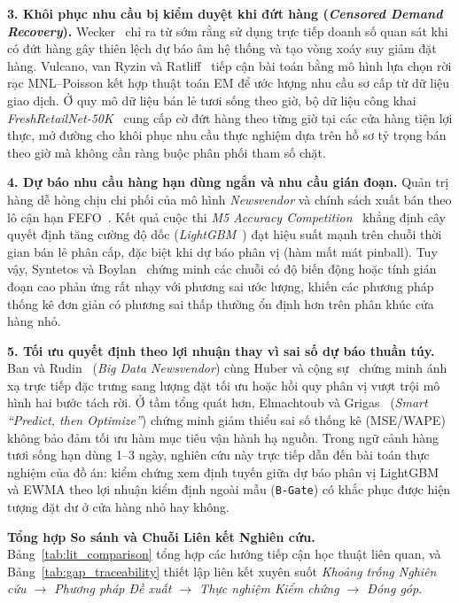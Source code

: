 \textbf{3. Khôi phục nhu cầu bị kiểm duyệt khi đứt hàng (\emph{Censored Demand Recovery}).}
Wecker~\cite{wecker1978stockouts} chỉ ra từ sớm rằng sử dụng trực tiếp doanh số quan sát khi có đứt hàng gây thiên lệch dự báo âm hệ thống và tạo vòng xoáy suy giảm đặt hàng. Vulcano, van Ryzin và Ratliff~\cite{vulcano2012primary} tiếp cận bài toán bằng mô hình lựa chọn rời rạc MNL--Poisson kết hợp thuật toán EM để ước lượng nhu cầu sơ cấp từ dữ liệu giao dịch. Ở quy mô dữ liệu bán lẻ tươi sống theo giờ, bộ dữ liệu công khai \emph{FreshRetailNet-50K}~\cite{freshretailnet50k} cung cấp cờ đứt hàng theo từng giờ tại các cửa hàng tiện lợi thực, mở đường cho khôi phục nhu cầu thực nghiệm dựa trên hồ sơ tỷ trọng bán theo giờ mà không cần ràng buộc phân phối tham số chặt.

\textbf{4. Dự báo nhu cầu hàng hạn dùng ngắn và nhu cầu gián đoạn.}
Quản trị hàng dễ hỏng chịu chi phối của mô hình \emph{Newsvendor} và chính sách xuất bán theo lô cận hạn FEFO~\cite{nahmias2011perishable,silver2017inventory}. Kết quả cuộc thi \emph{M5 Accuracy Competition}~\cite{makridakis2022m5} khẳng định cây quyết định tăng cường độ dốc (\emph{LightGBM}~\cite{ke2017lightgbm}) đạt hiệu suất mạnh trên chuỗi thời gian bán lẻ phân cấp, đặc biệt khi dự báo phân vị (hàm mất mát pinball). Tuy vậy, Syntetos và Boylan~\cite{syntetos2005intermittent} chứng minh các chuỗi có độ biến động hoặc tính gián đoạn cao phản ứng rất nhạy với phương sai ước lượng, khiến các phương pháp thống kê đơn giản có phương sai thấp thường ổn định hơn trên phân khúc cửa hàng nhỏ.

\textbf{5. Tối ưu quyết định theo lợi nhuận thay vì sai số dự báo thuần túy.}
Ban và Rudin~\cite{ban2019bigdata} (\emph{Big Data Newsvendor}) cùng Huber và cộng sự~\cite{huber2019newsvendor} chứng minh ánh xạ trực tiếp đặc trưng sang lượng đặt tối ưu hoặc hồi quy phân vị vượt trội mô hình hai bước tách rời. Ở tầm tổng quát hơn, Elmachtoub và Grigas~\cite{elmachtoub2022spo} (\emph{Smart ``Predict, then Optimize''}) chứng minh giảm thiểu sai số thống kê (MSE/WAPE) không bảo đảm tối ưu hàm mục tiêu vận hành hạ nguồn. Trong ngữ cảnh hàng tươi sống hạn dùng 1--3 ngày, nghiên cứu này trực tiếp dẫn đến bài toán thực nghiệm của đồ án: kiểm chứng xem định tuyến giữa dự báo phân vị LightGBM và EWMA theo lợi nhuận kiểm định ngoài mẫu (\texttt{B-Gate}) có khắc phục được hiện tượng đặt dư ở cửa hàng nhỏ hay không.

\textbf{Tổng hợp So sánh và Chuỗi Liên kết Nghiên cứu.}
Bảng~\ref{tab:lit_comparison} tổng hợp các hướng tiếp cận học thuật liên quan, và Bảng~\ref{tab:gap_traceability} thiết lập liên kết xuyên suốt \emph{Khoảng trống Nghiên cứu $\to$ Phương pháp Đề xuất $\to$ Thực nghiệm Kiểm chứng $\to$ Đóng góp}.

